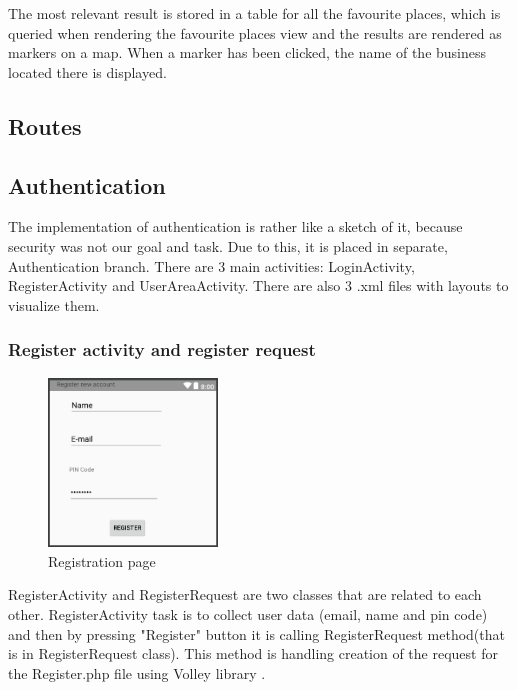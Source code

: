 \documentclass[12p]{article}
\begin{document}
    The most relevant result is stored in a table for all the favourite places, which is queried when rendering the favourite places view and the results are rendered as markers on a map. When a marker has been clicked, the name of the business located there is displayed.
    
    \subsection{Routes}
    
    \newpage
    
    \subsection{Authentication}
    
    The implementation of authentication is rather like a sketch of it, because security was not our goal and task. Due to this, it is placed in separate, Authentication branch. There are 3 main activities: LoginActivity, RegisterActivity and UserAreaActivity. There are also 3 .xml files with layouts to visualize them.
    
    \subsubsection{Register activity and register request}
        
    \begin{figure}[ht]
      \center
      \includegraphics[width=0.4\textwidth]{authentication/register.png}
      \caption{Registration page}
      \label{fig:registration_page}
    \end{figure}
    
    RegisterActivity and RegisterRequest are two classes that are related to each other. RegisterActivity task is to collect user data (email, name and pin code) and then by pressing "Register" button it is calling RegisterRequest method(that is in RegisterRequest class). This method is handling creation of the request for the Register.php file using Volley library \cite{VolleyLibrary}.
    
\end{document}
